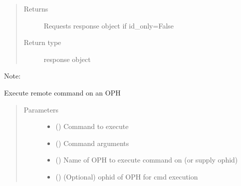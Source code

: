 \documentclass[letterpaper,10pt,english]{sphinxmanual}
\begin{document}
\begin{fulllineitems}
\begin{fulllineitems}
\begin{quote}
\begin{description}
\item[{Returns}] \leavevmode
\sphinxAtStartPar
Requests response object if id\_only=False

\item[{Return type}] \leavevmode
\sphinxAtStartPar
response object

\end{description}\end{quote}

\sphinxAtStartPar
Note:

\end{fulllineitems}


\begin{fulllineitems}
\label{\detokenize{b1diagnostics-class:bloxone.b1diagnostics.execute_task}}
\sphinxAtStartPar
Execute remote command on an OPH
\begin{quote}\begin{description}
\item[{Parameters}] \leavevmode\begin{itemize}
\item {} 
\sphinxAtStartPar
{} () \textendash{} Command to execute

\item {} 
\sphinxAtStartPar
{} () \textendash{} Command arguments

\item {} 
\sphinxAtStartPar
{} () \textendash{} Name of OPH to execute command on (or supply ophid)

\item {} 
\sphinxAtStartPar
{} () \textendash{} (Optional) ophid of OPH for cmd execution


\end{itemize}
\end{description}
\end{quote}
\end{fulllineitems}
\end{fulllineitems}
\end{document}
